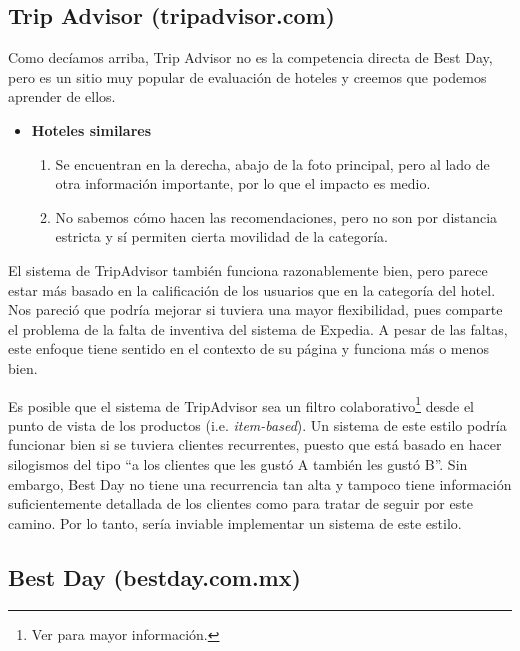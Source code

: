 \documentclass[12pt]{report}
\begin{document}
\subsection*{Trip Advisor (tripadvisor.com)}

Como decíamos arriba, Trip Advisor no es la competencia directa de Best Day, pero es un sitio muy popular de evaluación de hoteles y creemos que podemos aprender de ellos.
\begin{itemize}
	\item \textbf{Hoteles similares}
	\begin{enumerate}
		\item Se encuentran en la derecha, abajo de la foto principal, pero al lado de otra información importante, por lo que el impacto es medio.
		\item No sabemos cómo hacen las recomendaciones, pero no son por distancia estricta y sí permiten cierta movilidad de la categoría.
	\end{enumerate}
\end{itemize}
El sistema de TripAdvisor también funciona razonablemente bien, pero parece estar más basado en la calificación de los usuarios que en la categoría del hotel. Nos pareció que podría mejorar si tuviera una mayor flexibilidad, pues comparte el problema de la falta de inventiva del sistema de Expedia. A pesar de las faltas, este enfoque tiene sentido en el contexto de su página y funciona más o menos bien.

Es posible que el sistema de TripAdvisor sea un filtro colaborativo\footnote{Ver \cite{mmds} para mayor información.} desde el punto de vista de los productos (i.e. \emph{item-based}). Un sistema de este estilo podría funcionar bien si se tuviera clientes recurrentes, puesto que está basado en hacer silogismos del tipo ``a los clientes que les gustó A también les gustó B''. Sin embargo, Best Day no tiene una recurrencia tan alta y tampoco tiene información suficientemente detallada de los clientes como para tratar de seguir por este camino. Por lo tanto, sería inviable implementar un sistema de este estilo.


\subsection*{Best Day (bestday.com.mx)}
\end{document}
